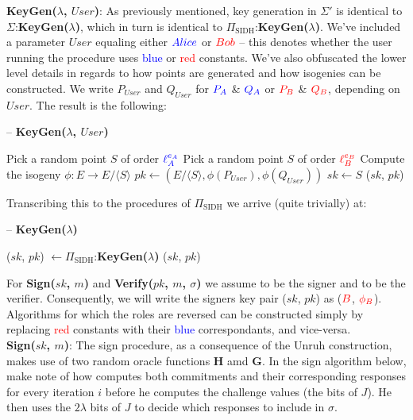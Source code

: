 \noindent
\textbf{KeyGen($\lambda$, $User$)}: As previously mentioned, key generation in $\Sigma'$ is identical to $\Sigma$:\textbf{KeyGen($\lambda$)}, which in turn is identical to $\Pi_{\text{SIDH}}$:\textbf{KeyGen($\lambda$)}. We've included a parameter $User$ equaling either $\textcolor{blue}{Alice}$ or $\textcolor{red}{Bob}$ -- this denotes whether the user running the procedure uses \textcolor{blue}{blue} or \textcolor{red}{red} constants. We've also obfuscated the lower level details in regards to how points are generated and how isogenies can be constructed. We write $P_{User}$ and $Q_{User}$ for $\textcolor{blue}{P_A}$ \& $\textcolor{blue}{Q_A}$ or $\textcolor{red}{P_B}$ \& $\textcolor{red}{Q_B}$, depending on $User$.  The result is the following:

\begin{algorithm}
\caption{-- \textbf{KeyGen($\lambda$, $User$)}}\label{euclid}
\begin{algorithmic}[1]
	\State Pick a random point $S$ of order $\textcolor{blue}{\ell_{A}^{e_A}}$
\EndIf
{}
	\State Pick a random point $S$ of order $\textcolor{red}{\ell_{B}^{e_B}}$
\EndIf
\State Compute the isogeny $\phi: E \rightarrow E/\langle S \rangle$
\State $pk \gets (E/\langle S \rangle, \phi(P_{User}), \phi(Q_{User}))$
\State $sk \gets S$
\State \Return ($sk$, $pk$)
\end{algorithmic}
\end{algorithm}

\noindent
Transcribing this to the procedures of $\Pi_{\text{SIDH}}$ we arrive (quite trivially) at:\\

\begin{algorithm}
\caption{-- \textbf{KeyGen($\lambda$)}}\label{euclid}
\begin{algorithmic}[1]
\State ($sk$, $pk$) $\gets \Pi_{\text{SIDH}}$:\textbf{KeyGen($\lambda$)}
\State \Return ($sk$, $pk$)
\end{algorithmic}
\end{algorithm}

For \textbf{Sign($sk$, $m$)} and \textbf{Verify($pk$, $m$, $\sigma$)} we assume \bob to be the signer and \alice to be the verifier. Consequently, we will write the signers key pair ($sk$, $pk$) as ($\textcolor{red}{B}$, $\textcolor{red}{\phi_B}$). Algorithms for which the roles are reversed can be constructed simply by replacing \textcolor{red}{red} constants with their \textcolor{blue}{blue} correspondants, and vice-versa.\\  

\noindent
\textbf{Sign($sk$, $m$)}: The sign procedure, as a consequence of the Unruh construction, makes use of two random oracle functions \textbf{H} amd \textbf{G}. In the sign algorithm below, make note of how \bob computes both commitments and their corresponding responses for every iteration $i$ before he computes the challenge values (the bits of $J$). He then uses the $2\lambda$ bits of $J$ to decide which responses to include in $\sigma$.\\


